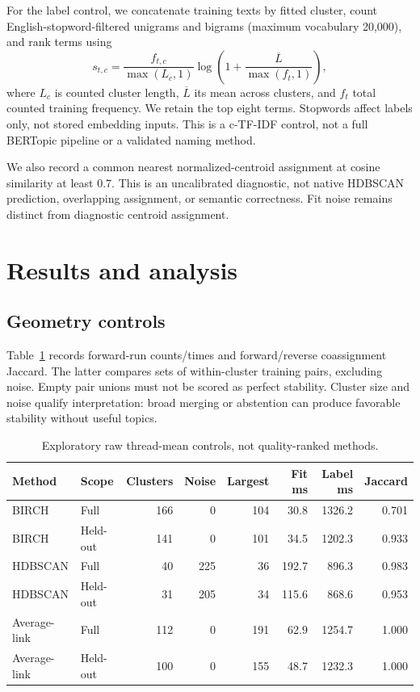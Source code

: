 \documentclass[11pt]{article}
\begin{document}
For the label control, we concatenate training texts by fitted cluster, count
English-stopword-filtered unigrams and bigrams (maximum vocabulary 20,000), and
rank terms using
\begin{equation}
 s_{t,c}=\frac{f_{t,c}}{\max(L_c,1)}
          \log\left(1+\frac{\overline{L}}{\max(f_t,1)}\right),
\end{equation}
where $L_c$ is counted cluster length, $\overline{L}$ its mean across clusters,
and $f_t$ total counted training frequency. We retain the top eight terms.
Stopwords affect labels only, not stored embedding inputs. This is a c-TF-IDF
control, not a full BERTopic pipeline or a validated naming method.

We also record a common nearest normalized-centroid assignment at cosine
similarity at least 0.7. This is an uncalibrated diagnostic, not native HDBSCAN
prediction, overlapping assignment, or semantic correctness. Fit noise remains
distinct from diagnostic centroid assignment.

\section{Results and analysis}
\subsection{Geometry controls}
Table~\ref{tab:geometry} records forward-run counts/times and forward/reverse
coassignment Jaccard. The latter compares sets of within-cluster training pairs,
excluding noise. Empty pair unions must not be scored as perfect stability.
Cluster size and noise qualify interpretation: broad merging or abstention can
produce favorable stability without useful topics.

\begin{table}[ht]
\centering\small
\begin{tabular}{llrrrrrr}
\toprule
Method & Scope & Clusters & Noise & Largest & Fit ms & Label ms & Jaccard\\
\midrule
BIRCH & Full &166&0&104&30.8&1326.2&0.701\\
BIRCH & Held-out &141&0&101&34.5&1202.3&0.933\\
HDBSCAN & Full &40&225&36&192.7&896.3&0.983\\
HDBSCAN & Held-out &31&205&34&115.6&868.6&0.953\\
Average-link & Full &112&0&191&62.9&1254.7&1.000\\
Average-link & Held-out &100&0&155&48.7&1232.3&1.000\\
\bottomrule
\end{tabular}
\caption{Exploratory raw thread-mean controls, not quality-ranked methods.}
\label{tab:geometry}
\end{table}
\end{document}
